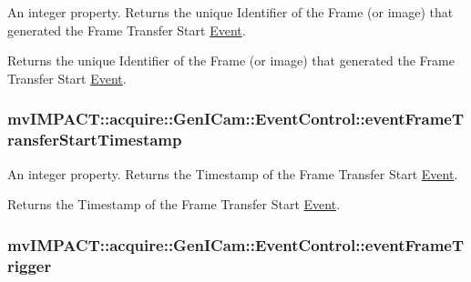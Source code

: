 An integer property. Returns the unique Identifier of the Frame (or image) that generated the Frame Transfer Start \hyperlink{classmv_i_m_p_a_c_t_1_1acquire_1_1_event}{Event}. 

Returns the unique Identifier of the Frame (or image) that generated the Frame Transfer Start \hyperlink{classmv_i_m_p_a_c_t_1_1acquire_1_1_event}{Event}. \hypertarget{classmv_i_m_p_a_c_t_1_1acquire_1_1_gen_i_cam_1_1_event_control_a445524678070f9f3ad9fb0276fe3ef9b}{
\subsubsection[{event\+Frame\+Transfer\+Start\+Timestamp}]{ mv\+I\+M\+P\+A\+C\+T\+::acquire\+::\+Gen\+I\+Cam\+::\+Event\+Control\+::event\+Frame\+Transfer\+Start\+Timestamp}}\label{classmv_i_m_p_a_c_t_1_1acquire_1_1_gen_i_cam_1_1_event_control_a445524678070f9f3ad9fb0276fe3ef9b}


An integer property. Returns the Timestamp of the Frame Transfer Start \hyperlink{classmv_i_m_p_a_c_t_1_1acquire_1_1_event}{Event}. 

Returns the Timestamp of the Frame Transfer Start \hyperlink{classmv_i_m_p_a_c_t_1_1acquire_1_1_event}{Event}. \hypertarget{classmv_i_m_p_a_c_t_1_1acquire_1_1_gen_i_cam_1_1_event_control_a2b05aba36546d5757ab20027e1ce4cff}{
\subsubsection[{event\+Frame\+Trigger}]{ mv\+I\+M\+P\+A\+C\+T\+::acquire\+::\+Gen\+I\+Cam\+::\+Event\+Control\+::event\+Frame\+Trigger}}\label{classmv_i_m_p_a_c_t_1_1acquire_1_1_gen_i_cam_1_1_event_control_a2b05aba36546d5757ab20027e1ce4cff}


